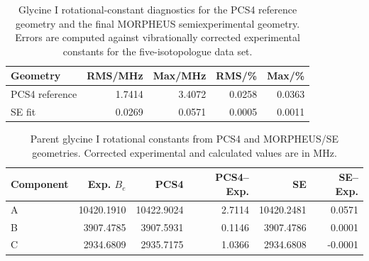 \begin{table}
\caption{Glycine I rotational-constant diagnostics for the PCS4 reference geometry and the final MORPHEUS semiexperimental geometry. Errors are computed against vibrationally corrected experimental constants for the five-isotopologue data set.}
\label{tab:glycine-I-pcs4-rotational}
\scriptsize
\setlength{\tabcolsep}{3pt}
\begin{tabular}{lrrrr}
\toprule
Geometry & RMS/MHz & Max/MHz & RMS/\% & Max/\% \\
\midrule
PCS4 reference & 1.7414 & 3.4072 & 0.0258 & 0.0363 \\
SE fit & 0.0269 & 0.0571 & 0.0005 & 0.0011 \\
\bottomrule
\end{tabular}
\end{table}

\begin{table}
\caption{Parent glycine I rotational constants from PCS4 and MORPHEUS/SE geometries. Corrected experimental and calculated values are in MHz.}
\label{tab:glycine-I-parent-rotational}
\scriptsize
\setlength{\tabcolsep}{2pt}
\begin{tabular}{lrrrrr}
\toprule
Component & Exp. $B_e$ & PCS4 & PCS4--Exp. & SE & SE--Exp. \\
\midrule
A & 10420.1910 & 10422.9024 & 2.7114 & 10420.2481 & 0.0571 \\
B & 3907.4785 & 3907.5931 & 0.1146 & 3907.4786 & 0.0001 \\
C & 2934.6809 & 2935.7175 & 1.0366 & 2934.6808 & -0.0001 \\
\bottomrule
\end{tabular}
\end{table}
